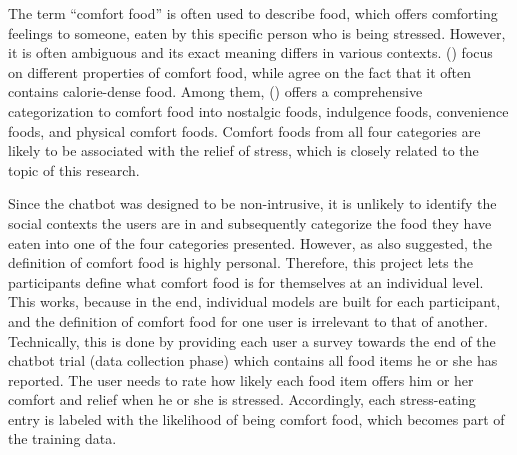 The term “comfort food” is often used to describe food, which offers comforting feelings to someone, eaten by this specific person who is being stressed. However, it is often ambiguous and its exact meaning differs in various contexts. \citeauthor{12_comfort_food_women, 14_comfort_food, 15_comfort_food_review} (\citeyear{12_comfort_food_women, 14_comfort_food, 15_comfort_food_review}) focus on different properties of comfort food, while agree on the fact that it often contains calorie-dense food. Among them, \citeauthor{14_comfort_food} (\citeyear{14_comfort_food}) offers a comprehensive categorization to comfort food into nostalgic foods, indulgence foods, convenience foods, and physical comfort foods. Comfort foods from all four categories are likely to be associated with the relief of stress, which is closely related to the topic of this research.

Since the chatbot was designed to be non-intrusive, it is unlikely to identify the social contexts the users are in and subsequently categorize the food they have eaten into one of the four categories \citeauthor{14_comfort_food} presented. However, as \citeauthor{14_comfort_food} also suggested, the definition of comfort food is highly personal. Therefore, this project lets the participants define what comfort food is for themselves at an individual level. This works, because in the end, individual models are built for each participant, and the definition of comfort food for one user is irrelevant to that of another. Technically, this is done by providing each user a survey towards the end of the chatbot trial (data collection phase) which contains all food items he or she has reported. The user needs to rate how likely each food item offers him or her comfort and relief when he or she is stressed. Accordingly, each stress-eating entry is labeled with the likelihood of being comfort food, which becomes part of the training data.
